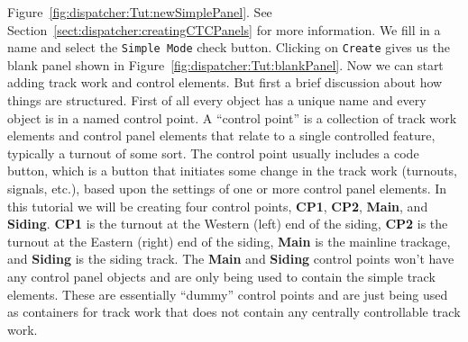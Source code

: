 Figure~\ref{fig:dispatcher:Tut:newSimplePanel}. See
Section~\ref{sect:dispatcher:creatingCTCPanels} for more information.
We fill in a name and select the \texttt{Simple Mode} check button.
Clicking on \texttt{Create} gives us the blank panel shown in
Figure~\ref{fig:dispatcher:Tut:blankPanel}. Now we can start adding
track work and control elements.  But first a brief discussion about how
things are structured.  First of all every object has a unique name and
every object is in a named control point.  A ``control point'' is a
collection of track work elements and control panel elements that relate
to a single controlled feature, typically a turnout of some sort. The
control point usually includes a code button, which is a button that
initiates some change in the track work (turnouts, signals, etc.), based
upon the settings of one or more control panel elements.  In this
tutorial we will be creating four control points, \textbf{CP1},
\textbf{CP2}, \textbf{Main}, and \textbf{Siding}.  \textbf{CP1} is the
turnout at the Western (left) end of the siding, \textbf{CP2} is the
turnout at the Eastern (right) end of the siding, \textbf{Main} is the
mainline trackage, and \textbf{Siding} is the siding track. The
\textbf{Main} and \textbf{Siding} control points won't have any control
panel objects and are only being used to contain the simple track
elements. These are essentially ``dummy'' control points and are just
being used as containers for track work that does not contain any
centrally controllable track work.

